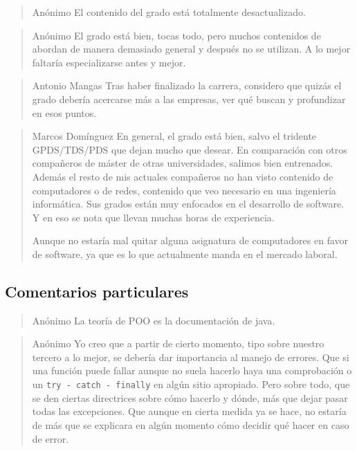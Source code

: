 \begin{quote}{Anónimo}
    El contenido del grado está totalmente desactualizado.
\end{quote}

\begin{quote}{Anónimo}
    El grado está bien, tocas todo,
    pero muchos contenidos de abordan de manera demasiado general y
    después no se utilizan.
    A lo mejor faltaría especializarse antes y mejor.
\end{quote}

\begin{quote}{Antonio Mangas}
    Tras haber finalizado la carrera,
    considero que quizás el grado debería acercarse más a las empresas,
    ver qué buscan y profundizar en esos puntos. 
\end{quote}

\begin{quote}{Marcos Domínguez}\label{qte:marcos-contents}
    En general, el grado está bien,
    salvo el tridente GPDS/TDS/PDS que dejan mucho que desear.
    En comparación con otros compañeros de máster de otras universidades,
    salimos bien entrenados.
    Además el resto de mis actuales compañeros no han visto
    contenido de computadores o de redes, 
    contenido que veo necesario en una ingeniería informática.
    Sus grados están muy enfocados en el desarrollo de software.
    Y en eso se nota que llevan muchas horas de experiencia.

    Aunque no estaría mal quitar alguna asignatura de computadores
    en favor de software,
    ya que es lo que actualmente manda en el mercado laboral.
\end{quote}

\subsection{Comentarios particulares}

\begin{quote}{Anónimo}
    La teoría de POO es la documentación de java.
\end{quote}

\begin{quote}{Anónimo}
    Yo creo que a partir de cierto momento,
    tipo sobre nuestro tercero a lo mejor,
    se debería dar importancia al manejo de errores.
    Que si una función puede fallar aunque no suela hacerlo
    haya una comprobación o un \lstinline{try - catch - finally}
    en algún sitio apropiado.
    Pero sobre todo, que se den ciertas directrices sobre cómo hacerlo y dónde,
    más que dejar pasar todas las excepciones.
    Que aunque en cierta medida ya se hace, no estaría de más que
    se explicara en algún momento cómo decidir qué hacer en caso de error.
\end{quote}

